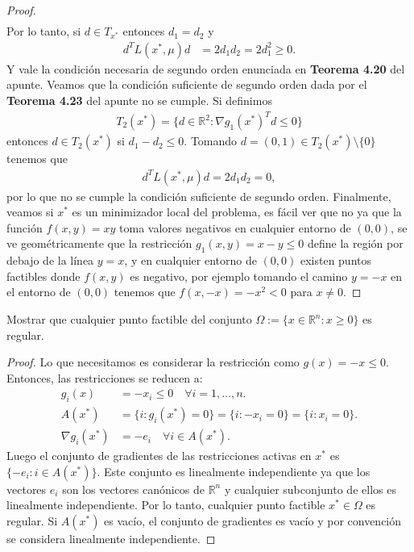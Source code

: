 \documentclass{article}
\newcommand{\R}{\mathbb{R}}
\newenvironment{theorem}[2][Ejercicio]{\begin{trivlist}
\item[\hskip \labelsep {\bfseries #1}\hskip \labelsep {\bfseries #2.}]}{\end{trivlist}}
\begin{document}
\begin{proof}
\begin{align*}
    \end{align*}
    Por lo tanto, si \( d \in T_{x^*} \) entonces \( d_1 = d_2 \) y \begin{align*}
        d^T L(x^*, \mu) d & = 2 d_1 d_2 = 2 d_1^2 \geq 0.
    \end{align*}
    Y vale la condición necesaria de segundo orden enunciada en \textbf{Teorema 4.20} del apunte.
    Veamos que la condición suficiente de segundo orden dada por el \textbf{Teorema 4.23} del apunte no se cumple. Si definimos \begin{align*}
        T_2(x^*) = \{ d \in \R^2 : {\nabla g_1(x^*)}^T d \leq 0 \}
    \end{align*}
    entonces \( d \in T_2(x^*) \) si \( d_1 - d_2 \leq 0 \). Tomando \( d = (0, 1) \in T_2(x^*) \setminus \{ 0 \} \) tenemos que \begin{align*}
        d^T L(x^*, \mu) d = 2 d_1 d_2 = 0,
    \end{align*}
    por lo que no se cumple la condición suficiente de segundo orden. Finalmente, veamos si \( x^* \) es un minimizador local del problema,
    es fácil ver que no ya que la función \( f(x, y) = xy \) toma valores negativos en cualquier entorno de \( (0, 0) \), se ve
    geométricamente que la restricción \( g_1(x, y) = x - y \leq 0 \) define la región por debajo de la línea \( y = x \), y en cualquier entorno de \( (0, 0) \) existen puntos factibles donde \( f(x, y) \) es negativo,
    por ejemplo tomando el camino \( y = -x \) en el entorno de \( (0, 0) \) tenemos que \( f(x, -x) = -x^2 < 0 \) para \( x \neq 0 \).
\end{proof}

\begin{theorem}{12}
    Mostrar que cualquier punto factible del conjunto \( \Omega := \{ x \in \R^n : x \geq 0 \} \) es regular.
\end{theorem}

\begin{proof}
    Lo que necesitamos es considerar la restricción como \( g(x) = -x \leq 0 \). Entonces, las restricciones se reducen a: \begin{align*}
        g_i(x)          & = -x_i \leq 0 \quad \forall i = 1, \ldots, n.                      \\
        A(x^*)          & = \{ i : g_i(x^*) = 0 \} = \{ i : -x_i = 0 \} = \{ i : x_i = 0 \}. \\
        \nabla g_i(x^*) & = -e_i \quad \forall i \in A(x^*).
    \end{align*}
    Luego el conjunto de gradientes de las restricciones activas en \( x^* \) es \( \{ -e_i : i \in A(x^*) \} \).
    Este conjunto es linealmente independiente ya que los vectores \( e_i \) son los vectores canónicos de \( \R^n \) y cualquier subconjunto de ellos es linealmente independiente.
    Por lo tanto, cualquier punto factible \( x^* \in \Omega \) es regular. Si \( A(x^*) \) es vacío, el conjunto de gradientes es vacío y por convención se considera linealmente independiente.
\end{proof}
\end{document}

